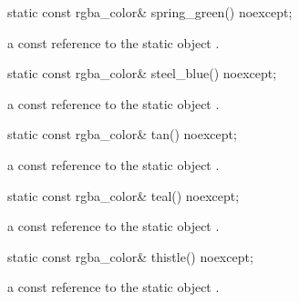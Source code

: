 \begin{itemdecl}
    static const rgba_color& spring_green() noexcept;
\end{itemdecl}
\begin{itemdescr}
    \pnum
    \returns
    a const reference to the static  object .
\end{itemdescr}

\begin{itemdecl}
    static const rgba_color& steel_blue() noexcept;
\end{itemdecl}
\begin{itemdescr}
    \pnum
    \returns
    a const reference to the static  object .
\end{itemdescr}

\begin{itemdecl}
    static const rgba_color& tan() noexcept;
\end{itemdecl}
\begin{itemdescr}
    \pnum
    \returns
    a const reference to the static  object .
\end{itemdescr}

\begin{itemdecl}
    static const rgba_color& teal() noexcept;
\end{itemdecl}
\begin{itemdescr}
    \pnum
    \returns
    a const reference to the static  object .
\end{itemdescr}

\begin{itemdecl}
    static const rgba_color& thistle() noexcept;
\end{itemdecl}
\begin{itemdescr}
    \pnum
    \returns
    a const reference to the static  object .
\end{itemdescr}

